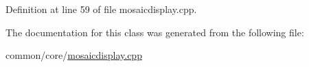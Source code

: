 Definition at line 59 of file mosaicdisplay.\+cpp.


\begin{DoxyCode}{0}
\end{DoxyCode}


The documentation for this class was generated from the following file\+:\begin{DoxyCompactItemize}
\item 
common/core/\mbox{\hyperlink{mosaicdisplay_8cpp}{mosaicdisplay.\+cpp}}\end{DoxyCompactItemize}
